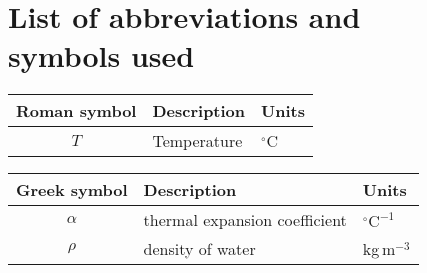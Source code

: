 \chapter*{List of abbreviations and\\ \vspace{-0.5em} symbols used}

	\setlongtables
	\begin{longtable}{cll}
	\hline
	Roman symbol & Description & Units\\
	\hline
	\endhead
	\hline
	\endfoot
	$T$ & Temperature & $^\circ$C\\
\hline
\end{longtable}

	\setlongtables
\begin{longtable}{cll}
\hline
Greek symbol & Description & Units\\
\hline
\endhead
\hline
\endfoot
$\alpha$ & thermal expansion coefficient & $^\circ\textrm{C}^{-1}$\\
$\rho$ & density of water & kg\,m$^{-3}$\\
\hline
\end{longtable}


